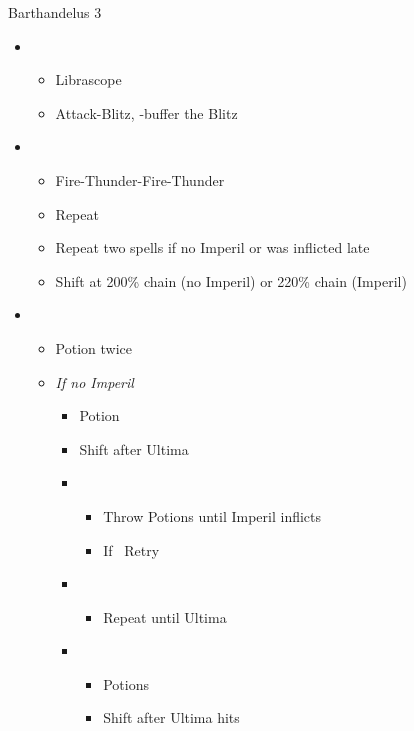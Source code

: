 \begin{battle}{Barthandelus 3}
	\begin{multicols}{2}
		\begin{itemize}
			\item \second
			      \begin{itemize}
				      \item Librascope
				      \item Attack-Blitz, \rav-buffer the Blitz
			      \end{itemize}
			\item \fifth
			      \begin{itemize}
				      \item Fire-Thunder-Fire-Thunder
				      \item Repeat
				      \item Repeat two spells if no Imperil or was inflicted late
				      \item Shift at 200\% chain (no Imperil) or 220\% chain (Imperil)
			      \end{itemize}
			\item \third
			      \begin{itemize}
				      \item Potion twice
				      \item \textit{If no Imperil}
				            \begin{itemize}
					            \item Potion
					            \item Shift after Ultima
					            \item \fifth
					                  \begin{itemize}
						                  \item Throw Potions until Imperil inflicts
						                  \item If \stagger\ Retry
					                  \end{itemize}
					            \item \first
					                  \begin{itemize}
						                  \item Repeat until Ultima
					                  \end{itemize}
					            \item \third
					                  \begin{itemize}
						                  \item Potions
						                  \item Shift after Ultima hits

\end{itemize}
\end{itemize}
\end{itemize}
\end{itemize}
\end{multicols}
\end{battle}
